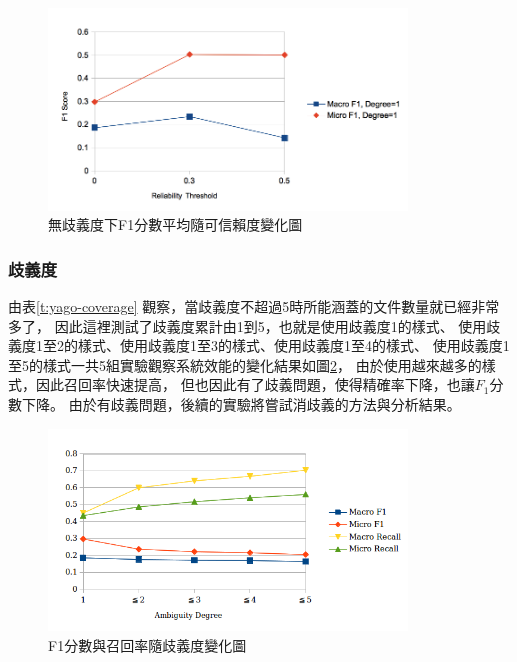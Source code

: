 \begin{figure}[h]
    \centering
    \includegraphics[width=0.85\textwidth]{images/04-reliability-f1}
    \caption{無歧義度下F1分數平均隨可信賴度變化圖}
    \label{i:reliability-f1}
\end{figure}



\subsubsection{歧義度}
由表\ref{t:yago-coverage} 觀察，當歧義度不超過5時所能涵蓋的文件數量就已經非常多了，
因此這裡測試了歧義度累計由1到5，也就是使用歧義度1的樣式、
使用歧義度1至2的樣式、使用歧義度1至3的樣式、使用歧義度1至4的樣式、
使用歧義度1至5的樣式一共5組實驗觀察系統效能的變化結果如圖\ref{i:degree}，
由於使用越來越多的樣式，因此召回率快速提高，
但也因此有了歧義問題，使得精確率下降，也讓$F_1$分數下降。
由於有歧義問題，後續的實驗將嘗試消歧義的方法與分析結果。

\begin{figure}[h]
    \centering
    \includegraphics[width=0.85\textwidth]{images/04-degree}
    \caption{F1分數與召回率隨歧義度變化圖}
    \label{i:degree}
\end{figure}

